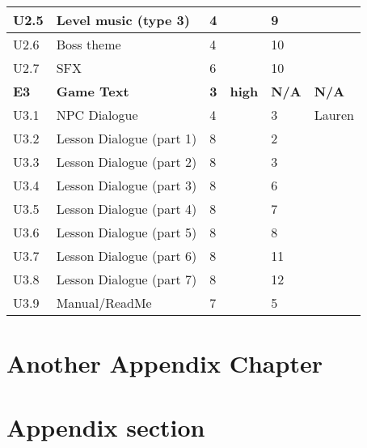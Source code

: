 \begin{longtable}[h!]{|p{1cm}|p{8.6cm}|p{1cm}|p{1.2cm}|p{1.2cm}|p{1.3cm}|}
    \hline
    U2.5 & Level music (type 3) & 4 & & 9 & \\
    \hline
    U2.6 & Boss theme           & 4 & & 10 & \\
    \hline
    U2.7 & SFX                  & 6 & & 10 & \\
    \hline
	\midrule
	\textbf{E3}   & \textbf{Game Text} & \textbf{3} & \textbf{high} & \textbf{N/A} & \textbf{N/A}\\
    \hline
    U3.1 & NPC Dialogue    & 4 & & 3 & Lauren\\
    \hline
    U3.2 & Lesson Dialogue (part 1) & 8 & & 2 & \\
    \hline
    U3.3 & Lesson Dialogue (part 2) & 8 & & 3 & \\
    \hline
    U3.4 & Lesson Dialogue (part 3) & 8 & & 6 & \\
    \hline
    U3.5 & Lesson Dialogue (part 4) & 8 & & 7 & \\
    \hline
    U3.6 & Lesson Dialogue (part 5) & 8 & & 8 & \\
    \hline
    U3.7 & Lesson Dialogue (part 6) & 8 & & 11 & \\
    \hline
    U3.8 & Lesson Dialogue (part 7) & 8 & & 12 & \\
    \hline
    U3.9 & Manual/ReadMe   & 7 & & 5 & \\
    \hline
    
	\midrule

\end{longtable}


\chapter{Another Appendix Chapter}
\blindtext[1]

\chapter{Appendix section}
\blindtext[1]
